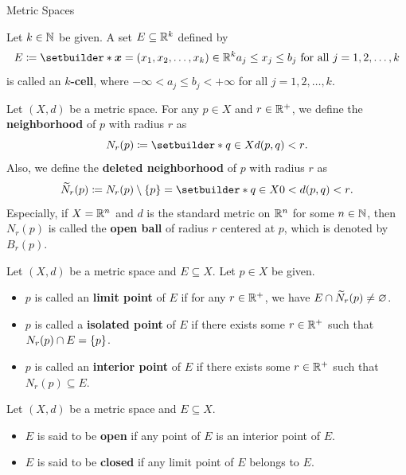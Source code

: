 \begin{section}{Metric Spaces}
\bigskip

\begin{definition} \label{def:KCell}
    Let $k \in \N$ be given. A set $E \subseteq \R^{k}$ defined by
    \[
    E \coloneqq \setbuilder*{\bm{x} = (x_{1}, x_{2}, \dots, x_{k})
    \in \R^{k}}{a_{j} \leq x_{j} \leq b_{j} \text{ for all } j = 1, 2, \dots, k}
    \]
    is called an \textbf{$k$-cell}, where $- \infty < a_{j} \leq b_{j} < + \infty$ for all $j = 1, 2, \dots, k$.
\end{definition}

\bigskip

\begin{definition} \label{def:NeighborhoodOpenBall}
    Let $(X, d)$ be a metric space. For any $p \in X$ and $r \in \R^{+}$,
    we define the \textbf{neighborhood} of $p$ with radius $r$ as
    \[
    N_{r}(p) \coloneqq \setbuilder*{q \in X}{d(p, q) < r}.
    \]
    Also, we define the \textbf{deleted neighborhood} of $p$ with radius $r$ as
    \[
    \widetilde{N}_{r}(p) \coloneqq N_{r}(p) \setminus \set*{p} = \setbuilder*{q \in X}{0 < d(p, q) < r}.
    \]
    Especially, if $X = \R^{n}$ and $d$ is the standard metric on $\R^{n}$ for some $n \in \N$,
    then $N_{r}(p)$ is called the \textbf{open ball} of radius $r$ centered at $p$, which is denoted by $B_{r}(p)$.
\end{definition}

\bigskip

\begin{definition} \label{def:LimitIsolatedInteriorPoints}
    Let $(X, d)$ be a metric space and $E \subseteq X$. Let $p \in X$ be given.
    \begin{itemize}
        \item $p$ is called an \textbf{limit point} of $E$
        if for any $r \in \R^{+}$, we have $E \cap \widetilde{N}_{r}(p) \neq \vnot$.
        \item $p$ is called a \textbf{isolated point} of $E$
        if there exists some $r \in \R^{+}$ such that $N_{r}(p) \cap E = \set*{p}$.
        \item $p$ is called an \textbf{interior point} of $E$
        if there exists some $r \in \R^{+}$ such that $N_{r}(p) \subseteq E$.
    \end{itemize}
\end{definition}

\bigskip

\begin{definition} \label{def:OpenClosedSets}
    Let $(X, d)$ be a metric space and $E \subseteq X$.
    \begin{itemize}
        \item $E$ is said to be \textbf{open} if any point of $E$ is an interior point of $E$.
        \item $E$ is said to be \textbf{closed} if any limit point of $E$ belongs to $E$.
    \end{itemize}
\end{definition}


\end{section}
